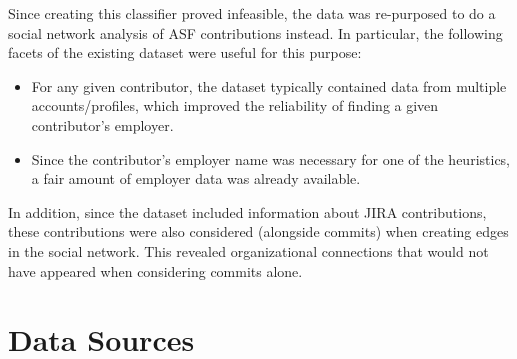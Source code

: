 Since creating this classifier proved infeasible, the data was re-purposed to do a social network analysis of ASF contributions instead. In particular, the following facets of the existing dataset were useful for this purpose:
\begin{itemize}
	\item For any given contributor, the dataset typically contained data from multiple accounts/profiles, which improved the reliability of finding a given contributor's employer.
	\item Since the contributor's employer name was necessary for one of the heuristics, a fair amount of employer data was already available.
\end{itemize}
In addition, since the dataset included information about JIRA contributions, these contributions were also considered (alongside commits) when creating edges in the social network. This revealed organizational connections that would not have appeared when considering commits alone.

\section{Data Sources}

